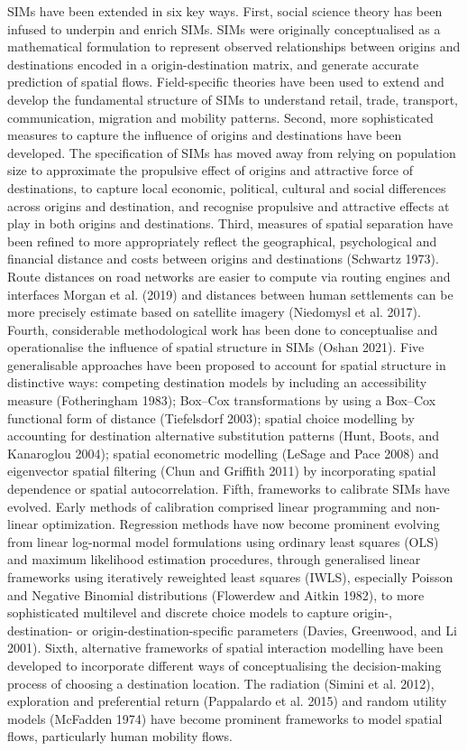 \documentclass[11pt,letterpaper]{article}
\begin{document}
SIMs have been extended in six key ways.
First, social science theory has been infused to underpin and enrich SIMs.
SIMs were originally conceptualised as a mathematical formulation to represent observed relationships between origins and destinations encoded in a origin-destination matrix, and generate accurate prediction of spatial flows.
Field-specific theories have been used to extend and develop the fundamental structure of SIMs to understand retail, trade, transport, communication, migration and mobility patterns.
Second, more sophisticated measures to capture the influence of origins and destinations have been developed.
The specification of SIMs has moved away from relying on population size to approximate the propulsive effect of origins and attractive force of destinations, to capture local economic, political, cultural and social differences across origins and destination, and recognise propulsive and attractive effects at play in both origins and destinations.
Third, measures of spatial separation have been refined to more appropriately reflect the geographical, psychological and financial distance and costs between origins and destinations (Schwartz 1973). Route distances on road networks are easier to compute via routing engines and interfaces Morgan et al. (2019) and distances between human settlements can be more precisely estimate based on satellite imagery (Niedomysl et al. 2017).
Fourth, considerable methodological work has been done to conceptualise and operationalise the influence of spatial structure in SIMs (Oshan 2021).
Five generalisable approaches have been proposed to account for spatial structure in distinctive ways: competing destination models by including an accessibility measure (Fotheringham 1983); Box--Cox transformations by using a Box--Cox functional form of distance (Tiefelsdorf 2003); spatial choice modelling by accounting for destination alternative substitution patterns (Hunt, Boots, and Kanaroglou 2004); spatial econometric modelling (LeSage and Pace 2008) and eigenvector spatial filtering (Chun and Griffith 2011) by incorporating spatial dependence or spatial autocorrelation.
Fifth, frameworks to calibrate SIMs have evolved.
Early methods of calibration comprised linear programming and non-linear optimization.
Regression methods have now become prominent evolving from linear log-normal model formulations using ordinary least squares (OLS) and maximum likelihood estimation procedures, through generalised linear frameworks using iteratively reweighted least squares (IWLS), especially Poisson and Negative Binomial distributions (Flowerdew and Aitkin 1982), to more sophisticated multilevel and discrete choice models to capture origin-, destination- or origin-destination-specific parameters (Davies, Greenwood, and Li 2001).
Sixth, alternative frameworks of spatial interaction modelling have been developed to incorporate different ways of conceptualising the decision-making process of choosing a destination location.
The radiation (Simini et al. 2012), exploration and preferential return (Pappalardo et al. 2015) and random utility models (McFadden 1974) have become prominent frameworks to model spatial flows, particularly human mobility flows.
\end{document}
